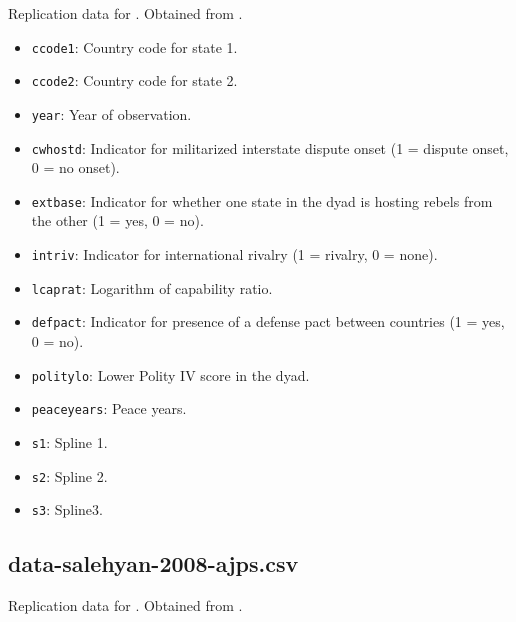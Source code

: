 \documentclass[12pt]{article}
\begin{document}
Replication data for \citet{salehyan2008}.
Obtained from \citet{salehyan2008jopdata}.

\begin{itemize}
  \item \texttt{ccode1}: Country code for state 1.
  \item \texttt{ccode2}: Country code for state 2.
  \item \texttt{year}: Year of observation.
  \item \texttt{cwhostd}: Indicator for militarized interstate dispute onset (1 = dispute onset, 0 = no onset).
  \item \texttt{extbase}: Indicator for whether one state in the dyad is hosting rebels from the other (1 = yes, 0 = no).
  \item \texttt{intriv}: Indicator for international rivalry (1 = rivalry, 0 = none).
  \item \texttt{lcaprat}: Logarithm of capability ratio.
  \item \texttt{defpact}: Indicator for presence of a defense pact between countries (1 = yes, 0 = no).
  \item \texttt{politylo}: Lower Polity IV score in the dyad.
  \item \texttt{peaceyears}: Peace years.
  \item \texttt{s1}: Spline 1.
  \item \texttt{s2}: Spline 2.
  \item \texttt{s3}: Spline3.
\end{itemize}


\subsection{data-salehyan-2008-ajps.csv}

Replication data for \citet{Salehyan:2008es}.
Obtained from \citet{salehyan2008ajpsdata}.
\end{document}
